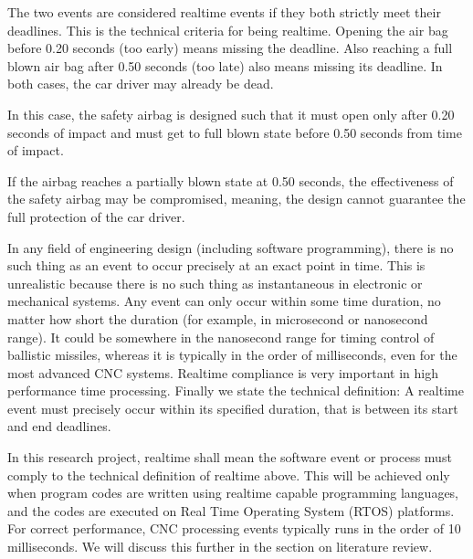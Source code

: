The two events are considered realtime events if they both strictly meet their deadlines. This is the technical criteria for being realtime. Opening the air bag before 0.20 seconds (too early) means missing the deadline. Also reaching a full blown air bag after 0.50 seconds (too late) also means missing its deadline. In both cases, the car driver may already be dead. 
\vspace*{1\baselineskip}

In this case, the safety airbag is designed such that it must open only after 0.20 seconds of impact and must get to full blown state before 0.50 seconds from time of impact.  
\vspace*{1\baselineskip}

If the airbag reaches a partially blown state at 0.50 seconds, the effectiveness of the safety airbag may be compromised, meaning, the design cannot guarantee the full protection of the car driver. 
\vspace*{1\baselineskip}

In any field of engineering design (including software programming), there is no such thing as an event to occur precisely at an exact point in time. This is unrealistic because there is no such thing as instantaneous in electronic or mechanical systems. Any event can only occur within some time duration, no matter how short the duration (for example, in microsecond or nanosecond range). It could be somewhere in the nanosecond range for timing control of ballistic missiles, whereas it is typically in the order of milliseconds, even for the most advanced CNC systems. Realtime compliance is very important in high performance time processing. Finally we state the technical definition: A realtime event must precisely occur within its specified duration, that is between its start and end deadlines. 

\begin{tcolorbox}[colback=green!15!white, colframe=red!75!black, title=Research consideration no. 5]
\justifying
In this research project, realtime shall mean the software event or process must comply to the technical definition of realtime above. This will be achieved only when program codes are written using realtime capable programming languages, and the codes are executed on Real Time Operating System (RTOS) platforms. For correct performance, CNC processing events typically runs in the order of 10 milliseconds. We will discuss this further in the section on literature review.
\end{tcolorbox} 

